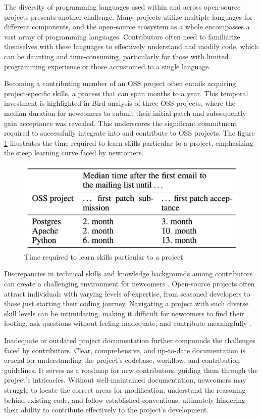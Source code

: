 The diversity of programming languages used within and across open-source projects presents another challenge. Many projects utilize multiple languages for different components, and the open-source ecosystem as a whole encompasses a vast array of programming languages. Contributors often need to familiarize themselves with these languages to effectively understand and modify code, which can be daunting and time-consuming, particularly for those with limited programming experience or those accustomed to a single language.


Becoming a contributing member of an OSS project often entails acquiring project-specific skills, a process that can span months to a year. This temporal investment is highlighted in Bird \cite{bird2007open} analysis of three OSS projects, where the median duration for newcomers to submit their initial patch and subsequently gain acceptance was revealed. This underscores the significant commitment required to successfully integrate into and contribute to OSS projects. The figure \ref{fig:timeskill} illustrates the time required to learn skills particular to a project, emphasizing the steep learning curve faced by newcomers.

\begin{figure}[ht]
    \centering
    \includegraphics[width=0.65\linewidth]{figs/timeskill.png}
    \caption{Time required to learn skills particular to a project \cite{bird2007open}}
    \label{fig:timeskill}
\end{figure}

Discrepancies in technical skills and knowledge backgrounds among contributors can create a challenging environment for newcomers \cite{01steinmacher2015systematic,04guizani2021long}. Open-source projects often attract individuals with varying levels of expertise, from seasoned developers to those just starting their coding journey. Navigating a project with such diverse skill levels can be intimidating, making it difficult for newcomers to find their footing, ask questions without feeling inadequate, and contribute meaningfully \cite{14hannebauer2017relationship}.

Inadequate or outdated project documentation further compounds the challenges faced by contributors. Clear, comprehensive, and up-to-date documentation is crucial for understanding the project's codebase, workflow, and contribution guidelines. It serves as a roadmap for new contributors, guiding them through the project's intricacies. Without well-maintained documentation, newcomers may struggle to locate the correct areas for modification, understand the reasoning behind existing code, and follow established conventions, ultimately hindering their ability to contribute effectively to the project's development.



